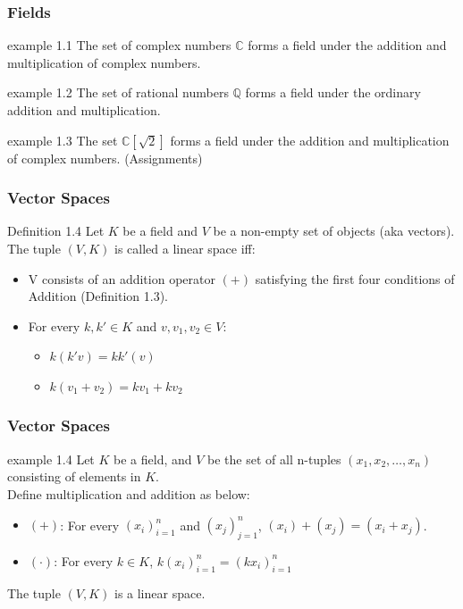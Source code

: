 \documentclass{beamer}
\begin{document}
\begin{frame}
    \frametitle{Fields}

    \begin{exampleblock}{example 1.1}
        The set of complex numbers $\mathbb{C}$ forms a field under the addition and multiplication of complex numbers.
    \end{exampleblock}

    \begin{exampleblock}{example 1.2}
        The set of rational numbers $\mathbb{Q}$ forms a field under the ordinary addition and multiplication.
    \end{exampleblock}

    \begin{exampleblock}{example 1.3}
        The set $\mathbb{C}[\sqrt{2}]$ forms a field under the addition and multiplication of complex numbers. (Assignments)
    \end{exampleblock}

\end{frame}

\begin{frame}
    \frametitle{Vector Spaces}
    
    \begin{block}{Definition 1.4}
        Let $K$ be a field and $V$ be a non-empty set of objects (aka vectors). The tuple $(V,K)$ is called a linear space iff:

        \begin{itemize}
            \item V consists of an addition operator $(+)$ satisfying the first four conditions of Addition (Definition 1.3).
            \item For every $k,k' \in K$ and $v,v_1,v_2 \in V$:
            \begin{itemize}
                \item $k(k'v) = kk'(v)$
                \item $k(v_1 + v_2) = kv_1 + kv_2$
            \end{itemize}
        \end{itemize}
    \end{block}
\end{frame}

\begin{frame}
    \frametitle{Vector Spaces}

    \begin{exampleblock}{example 1.4}
        Let $K$ be a field, and $V$ be the set of all n-tuples $(x_1,x_2, \dots, x_n)$ consisting of elements in $K$.\\
        Define multiplication and addition as below:
        \begin{itemize}
            \item $(+)$: For every $(x_i)_{i=1}^{n}$ and $(x_j)_{j=1}^{n}$, $(x_i)+(x_j)= (x_i+x_j)$.
            \item $(\cdot)$: For every $k \in K$, $k(x_i)_{i=1}^{n} = (kx_i)_{i=1}^{n}$
        \end{itemize}
        The tuple $(V,K)$ is a linear space.
    \end{exampleblock}
\end{frame}
\end{document}
